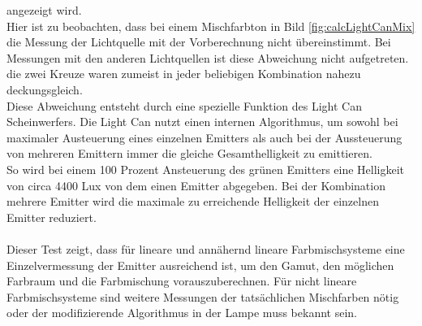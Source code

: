 \documentclass[11pt]{scrartcl}
\begin{document}
angezeigt wird.\\
Hier ist zu beobachten, dass bei einem Mischfarbton in Bild \ref{fig:calcLightCanMix} die Messung der Lichtquelle mit der Vorberechnung nicht
übereinstimmt. Bei Messungen mit den anderen Lichtquellen ist diese Abweichung nicht aufgetreten. die zwei Kreuze waren zumeist in jeder beliebigen
Kombination nahezu deckungsgleich.\\
Diese Abweichung entsteht durch eine spezielle Funktion des Light Can Scheinwerfers. Die Light Can nutzt einen internen Algorithmus, um sowohl bei
maximaler Austeuerung eines einzelnen Emitters als auch bei der Aussteuerung von mehreren Emittern immer die gleiche Gesamthelligkeit zu
emittieren.\\
So wird bei einem 100 Prozent Ansteuerung des grünen Emitters eine Helligkeit von circa 4400 Lux von dem einen Emitter abgegeben. Bei der
Kombination mehrere Emitter wird die maximale zu erreichende Helligkeit der einzelnen Emitter reduziert.\\
\\
Dieser Test zeigt, dass für lineare und annähernd lineare Farbmischsysteme eine Einzelvermessung der Emitter ausreichend ist, um den Gamut, den möglichen
Farbraum und die Farbmischung vorauszuberechnen. Für nicht lineare Farbmischsysteme sind weitere Messungen der tatsächlichen Mischfarben nötig oder der
modifizierende Algorithmus in der Lampe muss bekannt sein.
\end{document}
